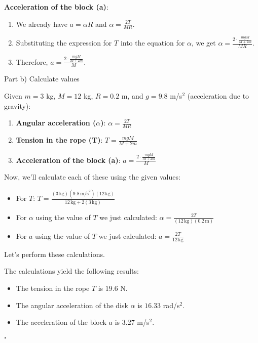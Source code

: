 \textbf{Acceleration of the block (a)}:
\begin{enumerate}
    \item We already have \( a = \alpha R \) and \( \alpha = \frac{2T}{M R} \).
    \item Substituting the expression for \( T \) into the equation for \( \alpha \), we get \( \alpha = \frac{2 \cdot \frac{mgM}{M + 2m}}{M R} \).
    \item Therefore, \( a = \frac{2 \cdot \frac{mgM}{M + 2m}}{M} \).
\end{enumerate}

Part b) Calculate values

Given \( m = 3 \) kg, \( M = 12 \) kg, \( R = 0.2 \) m, and \( g = 9.8 \) m/s\(^2\) (acceleration due to gravity):

\begin{enumerate}
    \item \textbf{Angular acceleration (\( \alpha \))}:
       \( \alpha = \frac{2T}{M R} \)
    \item \textbf{Tension in the rope (T)}:
       \( T = \frac{mgM}{M + 2m} \)
    \item \textbf{Acceleration of the block (a)}:
       \( a = \frac{2 \cdot \frac{mgM}{M + 2m}}{M} \)
\end{enumerate}

Now, we'll calculate each of these using the given values:

\begin{itemize}
    \item For \( T \):
      \( T = \frac{(3 \, \text{kg})(9.8 \, \text{m/s}^2)(12 \, \text{kg})}{12 \, \text{kg} + 2(3 \, \text{kg})} \)

    \item For \( \alpha \) using the value of \( T \) we just calculated:
      \( \alpha = \frac{2T}{(12 \, \text{kg})(0.2 \, \text{m})} \)

    \item For \( a \) using the value of \( T \) we just calculated:
      \( a = \frac{2T}{12 \, \text{kg}} \)
\end{itemize}

Let's perform these calculations.

The calculations yield the following results:

\begin{itemize}
    \item The tension in the rope \( T \) is \( 19.6 \) N.
    \item The angular acceleration of the disk \( \alpha \) is \( 16.33 \) rad/s\(^2\).
    \item The acceleration of the block \( a \) is \( 3.27 \) m/s\(^2\).
\end{itemize}"

